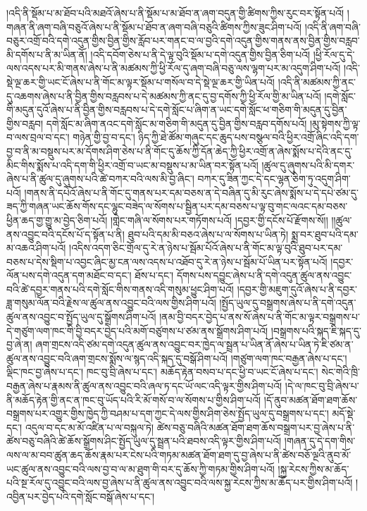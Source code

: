 །འདི་ནི་སྡོམ་པ་མ་ཐོབ་པའི་མཐའོ་ཞེས་པ་ནི་སྡོམ་པ་མ་ཐོབ་ན་ཞག་བདུན་གྱི་ཚིགས་ཀྱིས་རུང་བར་སྟོན་པའོ། །གཞན་ནི་ཞག་བཞི་བཅུའོ་ཞེས་པ་ནི་སྡོམ་པ་ཐོབ་ན་ཞག་བཞི་བཅུའི་ཚིགས་ཀྱིས་ཟུང་ཤིག་པའོ། །འདི་ནི་ཞག་བཞི་བཅུར་འགྲོ་བའི་དགེ་འདུན་གྱིས་བྱིན་གྱིས་རློབ་པར་གནང་བ་ལ་བྱའི་དགེ་འདུན་གྱིས་གནས་ནས་བྱིན་གྱིས་བརླབ་མི་དགོས་པ་ནི་མ་ཡིན་ནོ། །འདི་དབོག་ཅེས་པ་ནི་དེ་ལྟ་བུའི་སྡོམ་པ་དགེ་འདུན་གྱིས་བྱིན་ཅིག་པའོ། །ཕྱི་རོལ་དུ་དེ་ལས་འདས་པར་མི་གནས་ཞེས་པ་ནི་མཚམས་ཀྱི་ཕྱི་རོལ་དུ་ཞག་བཞི་བཅུ་ལས་ལྷག་པར་མ་འདུག་ཤིག་པའོ། །འདི་སྡེ་ལྔ་ཆར་གྱི་ཡང་ངོ་ཞེས་པ་ནི་གོང་མ་ལྟར་སྡོམ་པ་གསོལ་བ་དེ་སྡེ་ལྔ་ཆར་གྱི་ཡིན་པའོ། །འདི་ནི་མཚམས་ཀྱི་ནང་དུ་འཆགས་ཞེས་པ་ནི་བྱིན་གྱིས་བརླབས་པ་དེ་མཚམས་ཀྱི་ནང་དུ་བྱ་དགོས་ཀྱི་ཕྱི་རོལ་གྱི་མ་ཡིན་པའོ། །དགེ་སློང་གི་མདུན་དུའོ་ཞེས་པ་ནི་བྱིན་གྱིས་བརླབས་པ་དེ་དགེ་སློང་པ་ཞིག་ན་ཡང་དགེ་སློང་ཕ་གཅིག་གི་མདུན་དུ་བྱིན་གྱིས་བརླབ། དགེ་སློང་མ་ཞིག་ནའང་དགེ་སློང་མ་གཅིག་གི་མདུན་དུ་བྱིན་གྱིས་བརླབ་དགོས་པའོ། །མུ་སྟེགས་ཀྱི་ལྟ་བ་ལས་བྲལ་བ་དང་། གཉེན་གྱི་བྱ་བ་དང་། ཉིད་ཀྱི་ཐེ་ཚོམ་གཞུང་དང་ཆུད་པས་བསྩལ་བའི་ཕྱིར་འགྲོ་ཞིང་འདི་དག་བྱ་བ་ནི་མ་བསྡུས་པར་མ་དོགས་ཤིག་ཅེས་པ་ནི་གོང་དུ་ཆོས་ཀྱི་དོན་ཆེད་ཀྱི་ཕྱིར་འགྲོ་ན་ཞེས་སྨོས་པ་དེའི་ནང་དུ་མིང་གིས་སྨོས་པ་འདི་དག་གི་ཕྱིར་འགྲོ་བ་ཡང་མ་བསྡུས་པ་མ་ཡིན་བར་སྟོན་པའོ། །ཚུལ་དུ་ཞུགས་པའི་མི་དགར་ཞེས་པ་ནི་ཚུལ་དུ་ཞུགས་པའི་ཚེ་བཀར་བའི་ལས་མི་བྱ་ཞིང་། བཀར་དུ་ཟིན་ཀྱང་དེ་དང་ལྷན་ཅིག་ཏུ་འདུག་ཤིག་པའོ། །གནས་ནི་དཔེའོ་ཞེས་པ་ནི་གོང་དུ་གནས་པར་དམ་བཅས་ན་དེ་བཞིན་དུ་མི་རུང་ཞེས་སྨོས་པ་དེ་དཔེ་ཙམ་དུ་ཟད་ཀྱི་གཞན་ཡང་ཆོས་གོས་དང་ལྷུང་བཟེད་ལ་སོགས་པ་སྦྱིན་པར་དམ་བཅས་པ་ལྟ་བུ་གང་ལའང་དམ་བཅས་ཕྱིན་ཆད་གྱ་གྱུ་མ་བྱེད་ཅིག་པའོ། །གླེང་གཞི་ལ་སོགས་པར་གཏོགས་པའོ། །དབྱར་གྱི་དངོས་པོ་རྫོགས་སོ།། །།ཚུལ་ནས་འབྱུང་བའི་དངོས་པོ་ད་སྟོན་པ་ནི། ཐུབ་པའི་དམ་མི་བཅའ་ཞེས་པ་ལ་སོགས་པ་ཡིན་ཏེ། སྨྲ་བར་ཐུབ་པའི་དམ་མ་འཆའ་ཤིག་པའོ། །འདིས་འདག་ཅིང་གྲོལ་དུ་རེ་ན་ཉེས་པ་སྦོམ་པོའོ་ཞེས་པ་ནི་གོང་མ་ལྟ་བུའི་ཐུབ་པར་དམ་བཅས་པ་དེས་སྡིག་པ་འབྱང་ཞིང་མྱ་ངན་ལས་འདས་པ་འཐོབ་དུ་རེ་ན་ཉེས་པ་སྦོམ་པོ་ཡིན་པར་སྟོན་པའོ། །དབྱར་ལོན་པས་དགེ་འདུན་དག་མཐོང་བ་དང་། ཐོས་པ་དང་། དོགས་པས་དབྱུང་ཞེས་པ་ནི་དགེ་འདུན་ཚུལ་ནས་འབྱུང་བའི་ཚེ་དབྱར་གནས་པའི་དགེ་སློང་གིས་གནས་འདི་གསུམ་ཕྱུང་ཤིག་པའོ། །དབྱར་གྱི་མཇུག་དུའོ་ཞེས་པ་ནི་དབྱར་ཟླ་གསུམ་ལོན་བའི་རྗེས་ལ་ཚུལ་ནས་འབྱུང་བའི་ལས་གྱིས་ཤིག་པའོ། །སྤྱོད་ཡུལ་དུ་བསྒྲགས་ཞེས་པ་ནི་དགེ་འདུན་ཚུལ་ནས་འབྱུང་བ་སྤྱོད་ཡུལ་དུ་སྒྲོགས་ཤིག་པའོ། །ནམ་བྱི་བདར་བྱེད་པ་ནས་སོ་ཞེས་པ་ནི་གོང་མ་ལྟར་བསྒྲགས་པ་དེ་གཙུག་ལག་ཁང་གི་བྱི་བདར་བྱེད་པའི་མགོ་བཙུགས་པ་ཙམ་ནས་སྒྲོགས་ཤིག་པའོ། །བསྒྲགས་པའི་སྐད་ཇི་སྐད་དུ་བྱ་ཞེ་ན། ཞག་གྲངས་འདི་ཙམ་དགེ་འདུན་ཚུལ་ནས་འབྱུང་བར་ཁྱེད་ལ་སྦྲན་པ་ཡིན་ནོ་ཞེས་པ་ཡིན་ཏེ་ཇི་ཙམ་ན་ཚུལ་ནས་འབྱུང་བའི་ཞག་གྲངས་སྨོས་ལ་སྙད་འདི་སྐད་དུ་བསྒོ་ཤིག་པའོ། །གཙུག་ལག་ཁང་བརྒྱན་ཞེས་པ་དང་། ལྡིང་ཁང་བྱ་ཞེས་པ་དང་། ཁང་བུ་བྲི་ཞེས་པ་དང་། མཆོད་རྟེན་བསབ་པ་དང་ཕྱི་བ་ཡང་ངོ་ཞེས་པ་དང་། སེང་གེའི་ཁྲི་བརྒྱན་ཞེས་པ་རྣམས་ནི་ཚུལ་ནས་འབྱུང་བའི་ཞལ་ཏ་དང་ཡོ་ལང་འདི་ལྟར་གྱིས་ཤིག་པའོ། །དེ་ལ་ཁང་བུ་བྲི་ཞེས་པ་ནི་མཆོད་རྟེན་གྱི་ནང་ན་ཁང་བུ་ཡོད་པའི་རི་མོ་གསོ་བ་ལ་སོགས་པ་གྱིས་ཤིག་པའོ། །དོ་ནུབ་མཚན་ཐོག་ཐག་ཆོས་བསྒྲགས་པར་འགྱུར་གྱིས་ཁྱེད་ཀྱི་བཤམ་པ་དག་ཀྱང་དེ་ལས་གྱིས་ཤིག་ཅེས་སྤྱོད་ཡུལ་དུ་བསྒྲགས་པ་དང་། མདོ་སྡེ་དང་། འདུལ་བ་དང་མ་མོ་འཛིན་པ་ལ་བསྐུལ་ཏེ། ཚེས་བཅུ་བཞིའི་མཚན་ཐོག་ཐག་ཆོས་བསྒྲག་པར་བྱ་ཞེས་པ་ནི་ཚེས་བཅུ་བཞིའི་ཚེ་ཆོས་སྒྲོགས་ཤིང་སྤྱོད་ཡུལ་དུ་སྦྲན་པའི་ཐབས་འདི་ལྟར་གྱིས་ཤིག་པའོ། །གཞན་དུ་དེ་དག་གིས་ལས་ལ་མ་བབ་ཚུན་ཆད་ཆོས་རྣམ་པར་ངེས་པའི་གཏམ་མཚན་ཐོག་ཐག་དུ་བྱ་ཞེས་པ་ནི་ཚེས་བཅོ་ལྔའི་ནུབ་མོ་ཡང་ཚུལ་ནས་འབྱུང་བའི་ལས་བྱ་བ་ལ་མ་ཐུག་གི་བར་དུ་ཆོས་ཀྱི་གཏམ་གྱིས་ཤིག་པའོ། །སྐྱ་རེངས་ཀྱིས་མ་ཆོད་པའི་སྔ་རོལ་དུ་འབྱུང་བའི་ལས་བྱ་ཞེས་པ་ནི་ཚུལ་ནས་འབྱུང་བའི་ལས་སྐྱ་རེངས་ཀྱིས་མ་ཆོད་པར་གྱིས་ཤིག་པའོ། །འབྱིན་པར་བྱེད་པའི་དགེ་སློང་བསྒོ་ཞེས་པ་དང་། 
